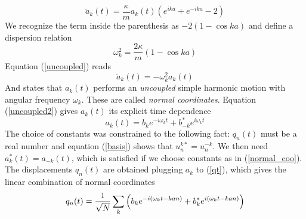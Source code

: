 \begin{equation}
    \ddot{a}_k(t)=\frac{\kappa}{m}a_k(t)({e}^{ika}+{e}^{-ika} -2)
    \label{uncoupled}
\end{equation}
We recognize the term inside the parenthesis as $-2(1-\cos{ka})$ and define a dispersion relation
\begin{equation}
    \omega_k^2=\frac{2\kappa}{m}(1-\cos{ka})
    \label{dispersion}
\end{equation}
Equation (\ref{uncoupled}) reads
\begin{equation}
    \ddot{a}_k(t)=-\omega_k^2a_k(t)
    \label{uncoupled2}
\end{equation}
And states that $a_k(t)$ performs an \textit{uncoupled} simple harmonic motion with angular frequency $\omega_k$. These are called \textit{normal coordinates}. Equation (\ref{uncoupled2}) gives $a_k(t)$ its explicit time dependence
\begin{equation}
    a_k(t)=b_k{e}^{-{i}\omega_kt}+b_{-k}^*e^{{i}\omega_kt}
    \label{normal_coo}
\end{equation}
The choice of constants was constrained to the following fact: $q_n(t)$ must be a real number and equation (\ref{basis}) shows that $u_{n}^{k*}=u_{n}^{-k}$. We then need $a_k^*(t)=a_{-k}(t)$, which is satisfied if we choose constants as in (\ref{normal_coo}). The displacements $q_n(t)$ are obtained plugging $a_k$ to (\ref{qt}), which gives the linear combination of normal coordinates
\begin{equation}
    q_n(t)=\frac{1}{\sqrt{N}}\sum_k\qty(b_k{e}^{-{i}(\omega_kt-kan)}+b_k^*{e}^{{i}(\omega_kt-kan)})
    \label{qt_normal}
\end{equation}

